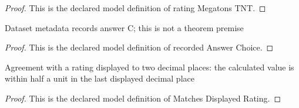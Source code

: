 \begin{proof}
  This is the declared model definition of rating Megatons TNT.
\end{proof}
\begin{definition}
  \label{def:physics:phyx-mini-0573:phyxminiproblems-problemphyxmini0573-recordedanswerchoice}
  Dataset metadata records answer C; this is not a theorem premise
\end{definition}
\begin{proof}
  This is the declared model definition of recorded Answer Choice.
\end{proof}
\begin{definition}
  \label{def:physics:phyx-mini-0573:phyxminiproblems-problemphyxmini0573-matchesdisplayedrating}
  Agreement with a rating displayed to two decimal places: the calculated value is within half a unit in the last displayed decimal place
\end{definition}
\begin{proof}
  This is the declared model definition of Matches Displayed Rating.
\end{proof}
